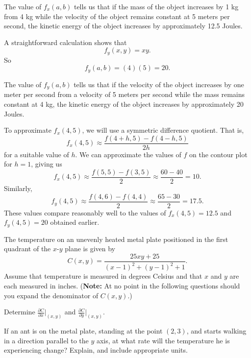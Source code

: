 \begin{exercises}
\begin{exerciseSolution}
    \item The value of $f_x(a,b)$ tells us that if the mass of the object increases by 1 kg from 4 kg while the velocity of the object remains constant at 5 meters per second, the kinetic energy of the object increases by approximately 12.5 Joules. 

    \item A straightforward calculation shows that 
\[f_y(x,y) = xy.\]
So 
\[f_y(a,b) = (4)(5) = 20.\]

    \item The value of $f_y(a,b)$ tells us that if the velocity of the object increases by one meter per second from a velocity of 5 meters per second while the mass remains constant at 4 kg, the kinetic energy of the object increases by approximately 20 Joules. 

		\item To approximate $f_x(4,5)$, we will use a symmetric difference quotient. That is,
\[f_x(4,5) \approx \frac{f(4+h,5)-f(4-h,5)}{2h}\]
for a suitable value of $h$. We can approximate the values of $f$ on the contour plot for $h = 1$, giving us 
\[f_x(4,5) \approx  \frac{f(5,5)-f(3,5)}{2} \approx \frac{60-40}{2} = 10.\]
Similarly,
\[f_y(4,5) \approx  \frac{f(4,6)-f(4,4)}{2} \approx \frac{65-30}{2} = 17.5.\]
These values compare reasonably well to the values of $f_x(4,5) = 12.5$ and $f_y(4,5) = 20$ obtained earlier.
    \ea

\end{exerciseSolution}

\item \label{Ez:10.2.2}    The temperature on an unevenly heated metal plate positioned in the first quadrant of the $x$-$y$ plane is given by 
$$C(x,y) = \frac{25xy+25}{(x-1)^2 + (y-1)^2 + 1}.$$
Assume that temperature is measured in degrees Celsius and that $x$ and $y$ are each measured in inches. ({\bf Note:} At no point in the following questions should you expand the denominator of $C(x,y)$.)

\ba

	\item Determine $\frac{\partial C}{\partial x}|_{(x,y)}$ and $\frac{\partial C}{\partial y}|_{(x,y)}$.  

	\item If an ant is on the metal plate, standing at the point $(2,3)$, and starts walking in a direction parallel to the $y$ axis, at what rate will the temperature he is experiencing change?  Explain, and include appropriate units.


\end{exercises}
